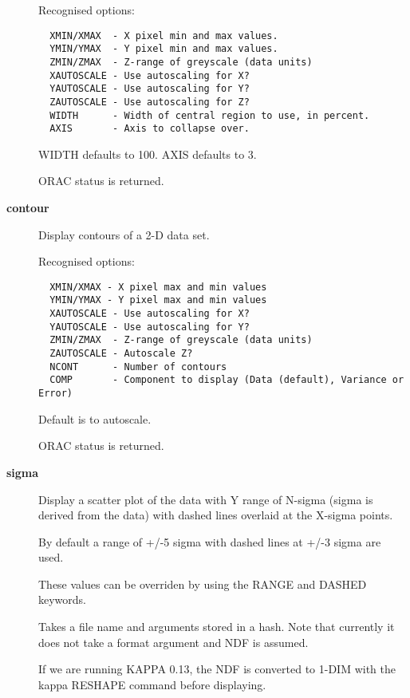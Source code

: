 \begin{description}
Recognised options:

\begin{verbatim}
  XMIN/XMAX  - X pixel min and max values.
  YMIN/YMAX  - Y pixel min and max values.
  ZMIN/ZMAX  - Z-range of greyscale (data units)
  XAUTOSCALE - Use autoscaling for X?
  YAUTOSCALE - Use autoscaling for Y?
  ZAUTOSCALE - Use autoscaling for Z?
  WIDTH      - Width of central region to use, in percent.
  AXIS       - Axis to collapse over.
\end{verbatim}


WIDTH defaults to 100. AXIS defaults to 3.



ORAC status is returned.


\item[{\textbf{contour}}] \mbox{}

Display contours of a 2-D data set.



Recognised options:

\begin{verbatim}
  XMIN/XMAX - X pixel max and min values
  YMIN/YMAX - Y pixel max and min values
  XAUTOSCALE - Use autoscaling for X?
  YAUTOSCALE - Use autoscaling for Y?
  ZMIN/ZMAX  - Z-range of greyscale (data units)
  ZAUTOSCALE - Autoscale Z?
  NCONT      - Number of contours
  COMP       - Component to display (Data (default), Variance or Error)
\end{verbatim}


Default is to autoscale.



ORAC status is returned.


\item[{\textbf{sigma}}] \mbox{}

Display a scatter plot of the data with Y range of N-sigma (sigma
is derived from the data) with dashed lines overlaid at the X-sigma
points.



By default a range of +/-5 sigma with dashed lines at +/-3 sigma
are used.



These values can be overriden by using the RANGE and DASHED
keywords.



Takes a file name and arguments stored in a hash.
Note that currently it does not take a format argument
and NDF is assumed.



If we are running KAPPA 0.13, the NDF is converted
to 1-DIM with the kappa RESHAPE command before
displaying.




\end{description}
